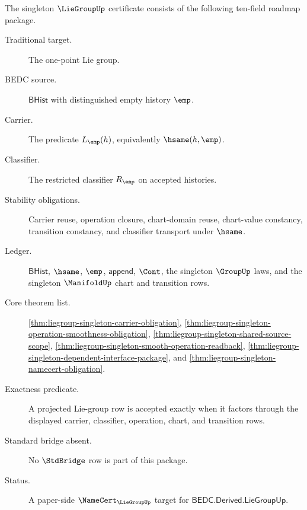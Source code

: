 \begin{theorem}
\label{thm:liegroup-singleton-downstream-unblock-package}
The singleton $\LieGroupUp$ certificate consists of the following ten-field
roadmap package.
\begin{description}
\item[Traditional target.] The one-point Lie group.
\item[BEDC source.] $\mathsf{BHist}$ with distinguished empty history $\emp$.
\item[Carrier.] The predicate $L_{\emp}(h)$, equivalently $\hsame(h,\emp)$.
\item[Classifier.] The restricted classifier $R_{\emp}$ on accepted histories.
\item[Stability obligations.] Carrier reuse, operation closure, chart-domain
reuse, chart-value constancy, transition constancy, and classifier transport
under $\hsame$.
\item[Ledger.] $\mathsf{BHist}$, $\hsame$, $\emp$, $\mathsf{append}$, $\Cont$,
the singleton $\GroupUp$ laws, and the singleton $\ManifoldUp$ chart and
transition rows.
\item[Core theorem list.]
\autoref{thm:liegroup-singleton-carrier-obligation},
\autoref{thm:liegroup-singleton-operation-smoothness-obligation},
\autoref{thm:liegroup-singleton-shared-source-scope},
\autoref{thm:liegroup-singleton-smooth-operation-readback},
\autoref{thm:liegroup-singleton-dependent-interface-package}, and
\autoref{thm:liegroup-singleton-namecert-obligation}.
\item[Exactness predicate.] A projected Lie-group row is accepted exactly when
it factors through the displayed carrier, classifier, operation, chart, and
transition rows.
\item[Standard bridge absent.] No $\StdBridge$ row is part of this package.
\item[Status.] A paper-side $\NameCert_{\LieGroupUp}$ target for
$\mathsf{BEDC.Derived.LieGroupUp}$.
\end{description}
\end{theorem}
